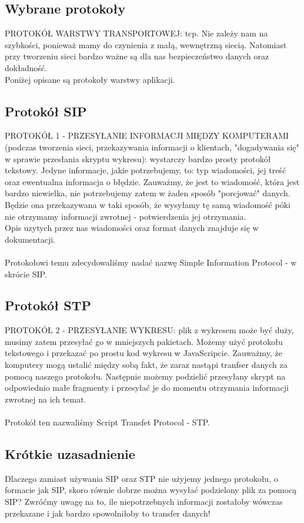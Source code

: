 \subsection{Wybrane protokoły}

PROTOKÓŁ WARSTWY TRANSPORTOWEJ: tcp. Nie zależy nam na szybkości, ponieważ mamy do czynienia z małą, wewnętrzną siecią. Natomiast przy tworzeniu sieci bardzo ważne są dla nas bezpieczeństwo danych oraz dokładność.\\
Poniżej opisane są protokoły warstwy aplikacji.

\subsection{Protokół SIP}

PROTOKÓŁ 1 - PRZESYŁANIE INFORMACJI MIĘDZY KOMPUTERAMI (podczas tworzenia sieci, przekazywania informacji o klientach, "dogadywania się" w sprawie przesłania skryptu wykresu): wystarczy bardzo prosty protokół tekstowy. Jedyne informacje, jakie potrzebujemy, to: typ wiadomości, jej treść oraz ewentualna informacja o błędzie. Zauważmy, że jest to wiadomość, która jest bardzo niewielka, nie potrzebujemy zatem w żaden sposób "porcjować" danych. Będzie ona przekazywana w taki sposób, że wysyłamy tę samą wiadomość póki nie otrzymamy informacji zwrotnej - potwierdzenia jej otrzymania. \\
Opis uzytych przez nas wiadomości oraz format danych znajduje się w dokumentacji.\\
\\
Protokołowi temu zdecydowaliśmy nadać nazwę Simple Information Protocol - w skrócie SIP.

\subsection{Protokół STP}
PROTOKÓŁ 2 - PRZESYŁANIE WYKRESU: plik z wykresem może być duży, musimy zatem przesyłać go w mniejszych pakietach. Możemy użyć protokołu tekstowego i przekazać po prostu kod wykresu w JavaScripcie. Zauważmy, że komputery mogą ustalić między sobą fakt, że zaraz nastąpi tranfser danych za pomocą naszego protokołu. Następnie możemy podzielić przesyłany skrypt na odpowiednio małe fragmenty i przesyłać je do momentu otrzymania informacji zwrotnej na ich temat.\\
\\
Protokół ten nazwaliśmy Script Transfet Protocol - STP.

\subsection{Krótkie uzasadnienie}

Dlaczego zamiast używania SIP oraz STP nie użyjemy jednego protokołu, o formacie jak SIP, skoro równie dobrze można wysyłać podzielony plik za pomocą SIP? Zwróćmy uwagę na to, ile niepotrzebnych informacji zostałoby wówczas przekazane i jak bardzo spowolniłoby to transfer danych!
